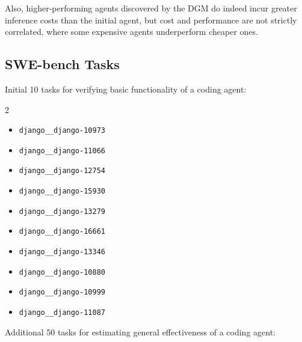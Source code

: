 \documentclass{article}
\begin{document}
Also, higher-performing agents discovered by the DGM do indeed incur greater inference costs than the initial agent, but cost and performance are not strictly correlated, where some expensive agents underperform cheaper ones.

\subsection{SWE-bench Tasks}
\label{app:swebench-tasks}

Initial 10 tasks for verifying basic functionality of a coding agent:

\begin{multicols}{2}
\begin{itemize}
    \item \texttt{django\_\_django-10973}
    \item \texttt{django\_\_django-11066}
    \item \texttt{django\_\_django-12754}
    \item \texttt{django\_\_django-15930}
    \item \texttt{django\_\_django-13279}
    \item \texttt{django\_\_django-16661}
    \item \texttt{django\_\_django-13346}
    \item \texttt{django\_\_django-10880}
    \item \texttt{django\_\_django-10999}
    \item \texttt{django\_\_django-11087}
\end{itemize}
\end{multicols}


Additional 50 tasks for estimating general effectiveness of a coding agent:
\end{document}
